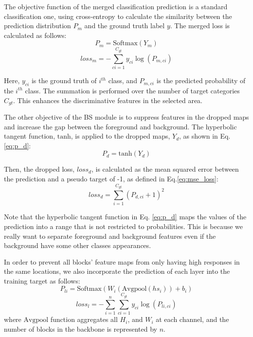 \documentclass[journal]{IEEEtran}
\begin{document}
The objective function of the merged classification prediction is a standard classification one, using cross-entropy to calculate the similarity between the prediction distribution $P_{m}$ and the ground truth label $y$. The merged loss is calculated as follows:
\begin{equation} \label{eq:p_m}
P_{m} = \text{Softmax}(Y_{m})
\end{equation}
\begin{equation} \label{eq:cross_entropy}
loss_{m} = -\sum_{ci=1}^{C_{gt}} y_{ci} \log(P_{m,ci})
\end{equation}

Here, $y_{ci}$ is the ground truth of $i^{th}$ class, and $P_{m,ci}$ is the predicted probability of the $i^{th}$ class. The summation is performed over the number of target categories $C_{gt}$. This enhances the discriminative features in the selected area.  

The other objective of the BS module is to suppress features in the dropped maps and increase the gap between the foreground and background. The hyperbolic tangent function, $\text{tanh}$, is applied to the dropped maps, $Y_{d}$, as shown in Eq.\eqref{eq:p_d}:
\begin{equation} \label{eq:p_d}
P_{d} = \text{tanh}(Y_{d})
\end{equation}

Then, the dropped loss, $loss_{d}$, is calculated as the mean squared error between the prediction and a pseudo target of -1, as defined in Eq.\eqref{eq:mse_loss}:
\begin{equation} \label{eq:mse_loss}
loss_{d} = \sum_{i=1}^{C_{gt}} (P_{d,ci} + 1)^2
\end{equation}

Note that the hyperbolic tangent function in Eq. \eqref{eq:p_d} maps the values of the prediction into a range that is not restricted to probabilities. This is because we really want to separate foreground and background features even if the background have some other classes appearances. 

In order to prevent all blocks' feature maps from only having high responses in the same locations, we also incorporate the prediction of each layer into the training target as follows:
\begin{equation} \label{eq:layer_pred}
P_{li} = \text{Softmax}(W_{i}(\text{Avgpool}(hs_{i})) + b_{i})
\end{equation}
\begin{equation} \label{eq:loss_l}
loss_{l} = -\sum_{i=1}^{n} \sum_{ci=1}^{C_{gt}} y_{ci} \log(P_{li, ci})
\end{equation}
where $\text{Avgpool}$ function aggregates all $H_{i}$, and $W_{i}$ at each channel, and the number of blocks in the backbone is represented by $n$.
\end{document}
